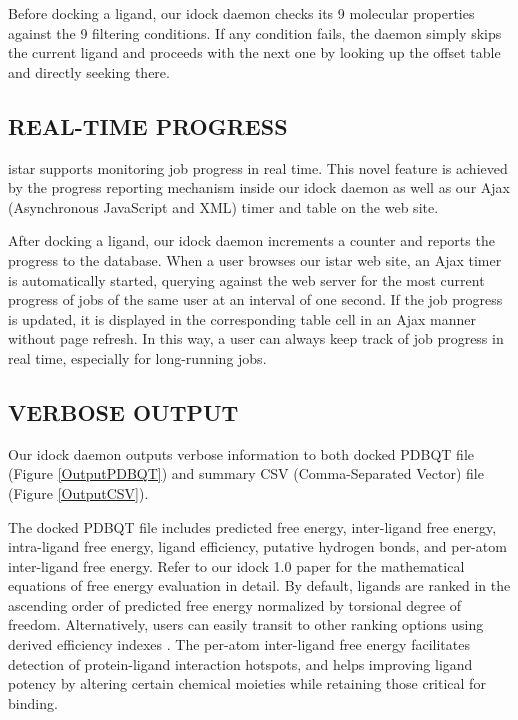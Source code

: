 \documentclass[12pt]{article}
\begin{document}
Before docking a ligand, our idock daemon checks its 9 molecular properties against the 9 filtering conditions. If any condition fails, the daemon simply skips the current ligand and proceeds with the next one by looking up the offset table and directly seeking there.

\subsection*{\sffamily \large REAL-TIME PROGRESS}

istar supports monitoring job progress in real time. This novel feature is achieved by the progress reporting mechanism inside our idock daemon as well as our Ajax (Asynchronous JavaScript and XML) timer and table on the web site.

After docking a ligand, our idock daemon increments a counter and reports the progress to the database. When a user browses our istar web site, an Ajax timer is automatically started, querying against the web server for the most current progress of jobs of the same user at an interval of one second. If the job progress is updated, it is displayed in the corresponding table cell in an Ajax manner without page refresh. In this way, a user can always keep track of job progress in real time, especially for long-running jobs.

\subsection*{\sffamily \large VERBOSE OUTPUT}

Our idock daemon outputs verbose information to both docked PDBQT file (Figure \ref{OutputPDBQT}) and summary CSV (Comma-Separated Vector) file (Figure \ref{OutputCSV}).

The docked PDBQT file includes predicted free energy, inter-ligand free energy, intra-ligand free energy, ligand efficiency, putative hydrogen bonds, and per-atom inter-ligand free energy. Refer to our idock 1.0 paper \citep{1153} for the mathematical equations of free energy evaluation in detail. By default, ligands are ranked in the ascending order of predicted free energy normalized by torsional degree of freedom. Alternatively, users can easily transit to other ranking options using derived efficiency indexes \citep{335,336,337}. The per-atom inter-ligand free energy facilitates detection of protein-ligand interaction hotspots, and helps improving ligand potency by altering certain chemical moieties while retaining those critical for binding.
\end{document}
